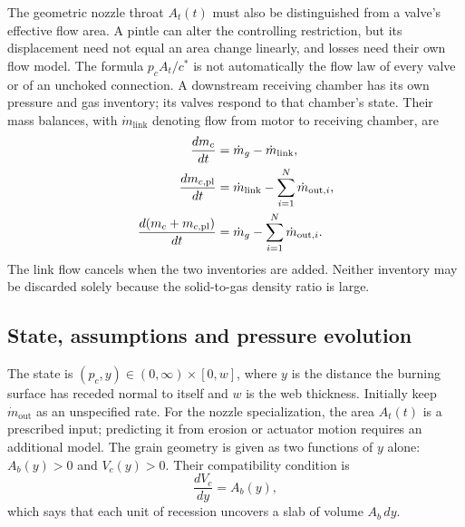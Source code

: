 The geometric nozzle throat $A_t(t)$ must also be distinguished from
a valve's effective flow area. A pintle can alter the controlling
restriction, but its displacement need not equal an area change
linearly, and losses need their own flow model. The formula
$p_cA_t/c^*$ is not automatically the flow law of every valve or of
an unchoked connection. A downstream receiving chamber has its own
pressure and gas inventory; its valves respond to that chamber's
state. Their mass balances, with $\dot m_{\mathrm{link}}$ denoting
flow from motor to receiving chamber, are
\begin{align}
 \frac{dm_c}{dt}
 &=\dot m_g-\dot m_{\mathrm{link}},\notag\\
 \frac{dm_{c,\mathrm{pl}}}{dt}
 &=\dot m_{\mathrm{link}}
   -\sum_{i=1}^{N}\dot m_{\mathrm{out},i},\notag\\
 \frac{d(m_c+m_{c,\mathrm{pl}})}{dt}
 &=\dot m_g-\sum_{i=1}^{N}\dot m_{\mathrm{out},i}.
 \label{eq:sb-two-chamber-mass}
\end{align}
The link flow cancels when the two inventories are added. Neither
inventory may be discarded solely because the solid-to-gas density
ratio is large.


\subsection{State, assumptions and pressure evolution}
\label{sec:sb-pressure-evolution}
The state is $(p_c,y)\in(0,\infty)\times[0,w]$, where $y$ is the distance
the burning surface has receded normal to itself and $w$ is the web
thickness. Initially keep $\dot m_{\mathrm{out}}$ as an unspecified rate.
For the nozzle specialization, the area $A_t(t)$ is a prescribed input;
predicting it from erosion or actuator motion requires an additional model.
The grain geometry is given as two functions of $y$ alone:
$A_b(y)>0$ and $V_c(y)>0$. Their compatibility condition is
\begin{equation}\label{eq:sb-volume-rate}
 \frac{dV_c}{dy}=A_b(y),
\end{equation}
which says that each unit of recession uncovers a slab of volume $A_b\,dy$.


